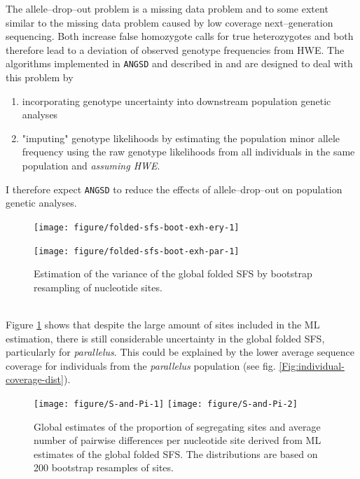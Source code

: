 \documentclass[a4paper,12pt,times,print,index,custombib,custommargin]{PhDThesisPSnPDF}\usepackage[]{graphicx}\usepackage[]{color}
\newenvironment{knitrout}{}{} %
\begin{document}
The allele--drop--out problem is a missing data problem and to some extent similar to the missing data problem caused by low coverage next--generation sequencing. Both increase false homozygote calls for true heterozygotes and both therefore lead to a deviation of observed genotype frequencies from \gls{HWE}. The algorithms implemented in \texttt{ANGSD} and described in \cite{Li2011} and \cite{Nielsen2012} are designed to deal with this problem by
\begin{enumerate}
\item incorporating genotype uncertainty into downstream population genetic analyses
\item "imputing" genotype likelihoods by estimating the population minor allele frequency using the raw genotype likelihoods from all individuals in the same population and \emph{assuming \gls{HWE}}.
\end{enumerate}
I therefore expect \texttt{ANGSD} to reduce the effects of allele--drop--out on population genetic analyses.
%
\begin{figure}[htbp]
\centering
\begin{knitrout}
\color{fgcolor}

{\centering \texttt{[image: figure/folded-sfs-boot-exh-ery-1]} 

}



\end{knitrout}
\begin{knitrout}
\color{fgcolor}

{\centering \texttt{[image: figure/folded-sfs-boot-exh-par-1]} 

}



\end{knitrout}
\caption{Estimation of the variance of the global folded \gls{SFS} by bootstrap resampling of nucleotide sites.}
\label{Fig:folded-sfs-boot-exh}
\end{figure}
%
\\
Figure \ref{Fig:folded-sfs-boot-exh} shows that despite the large amount of sites included in the ML estimation, there is still considerable uncertainty in the global folded \gls{SFS}, particularly for \textit{parallelus}. This could be explained by the lower average sequence coverage for individuals from the \textit{parallelus} population (see fig. \ref{Fig:individual-coverage-dist}).
%
\begin{figure}[htb]
\centering
\begin{knitrout}
\color{fgcolor}

{\centering \texttt{[image: figure/S-and-Pi-1]} 
\texttt{[image: figure/S-and-Pi-2]} 

}



\end{knitrout}
\caption{Global estimates of the proportion of segregating sites and average number of pairwise differences per nucleotide site derived from ML estimates of the global folded \gls{SFS}. The distributions are based on 200 bootstrap resamples of sites.}
\label{Fig:S-and-Pi}
\end{figure}
\end{document}
